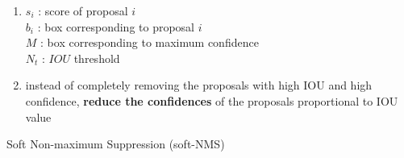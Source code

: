 \begin{enumerate}
    \item $s_i$ : score of proposal $i$ \\
            $b_i$ : box corresponding to proposal $i$ \\
            $M$ : box corresponding to maximum confidence \\
            $N_t$ : $IOU$ threshold
    
    \item instead of completely removing the proposals with high IOU and high confidence, \textbf{reduce the confidences} of the proposals proportional to IOU value

    
\end{enumerate}

\begin{algorithm}[h]
    \caption{Soft Non-maximum Suppression (soft-NMS) \cite{medium/towardsdatascience.com/non-maximum-suppression-nms-93ce178e177c,arxiv/1704.04503-soft-nms}}


\end{algorithm}




